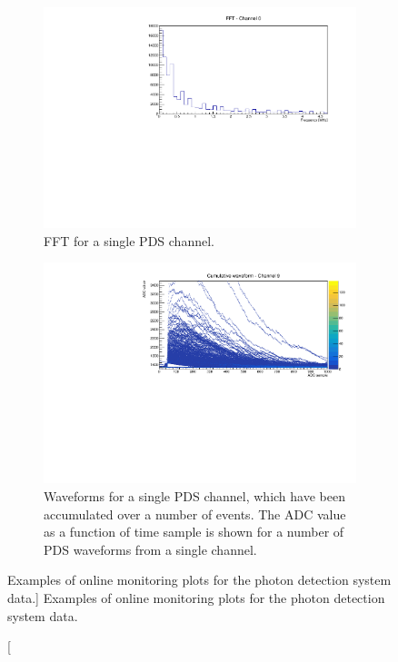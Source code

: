\begin{figure}

	\centering

	\begin{subfigure}[b]{0.8\textwidth}
		\centering
		\vspace{3mm}
		\includegraphics[width=\textwidth]{figures/pds_fft.pdf}
		\caption {FFT for a single PDS channel.}
		\label{fig:PDS_FFT}
	\end{subfigure}

	\begin{subfigure}[b]{0.8\textwidth}
		\centering
		\vspace{3mm}
		\includegraphics[width=\textwidth]{figures/pds_wav.pdf}
		\caption {Waveforms for a single PDS channel, which have been accumulated
		over a number of events. The ADC value as a function of time sample is shown
		for a number of PDS waveforms from a single channel.}
		\label{fig:PDS_wav}
	\end{subfigure}

	\caption
	[Examples of online monitoring plots for the photon detection system data.]
	{Examples of online monitoring plots for the photon detection system data.}
	\label{fig:pds_om}

\end{figure}

